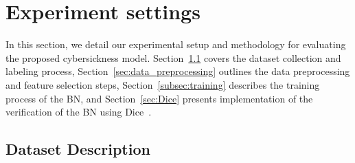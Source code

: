 \documentclass{vgtc}                          %
\begin{document}


\section{Experiment settings}
In this section, we detail our experimental setup and methodology for evaluating the proposed cybersickness model. Section~\ref{subsec:dataset} covers the dataset collection and labeling process, Section~\ref{sec:data_preprocessing} outlines the data preprocessing and feature selection steps, Section~\ref{subsec:training} describes the training process of the BN, and Section~\ref{sec:Dice} presents implementation of the verification of the BN using Dice~\cite{dice}.

\subsection{Dataset Description}
\label{subsec:dataset}
\end{document}

